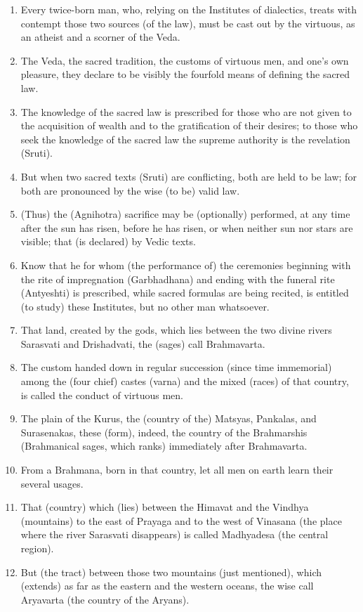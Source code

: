 \begin{enumerate}
\item Every twice-born man, who, relying on the Institutes of dialectics, treats with contempt those two sources (of the law), must be cast out by the virtuous, as an atheist and a scorner of the Veda.
\item The Veda, the sacred tradition, the customs of virtuous men, and one's own pleasure, they declare to be visibly the fourfold means of defining the sacred law.
\item The knowledge of the sacred law is prescribed for those who are not given to the acquisition of wealth and to the gratification of their desires; to those who seek the knowledge of the sacred law the supreme authority is the revelation (Sruti).
\item But when two sacred texts (Sruti) are conflicting, both are held to be law; for both are pronounced by the wise (to be) valid law.
\item (Thus) the (Agnihotra) sacrifice may be (optionally) performed, at any time after the sun has risen, before he has risen, or when neither sun nor stars are visible; that (is declared) by Vedic texts.
\item Know that he for whom (the performance of) the ceremonies beginning with the rite of impregnation (Garbhadhana) and ending with the funeral rite (Antyeshti) is prescribed, while sacred formulas are being recited, is entitled (to study) these Institutes, but no other man whatsoever.
\item That land, created by the gods, which lies between the two divine rivers Sarasvati and Drishadvati, the (sages) call Brahmavarta.
\item The custom handed down in regular succession (since time immemorial) among the (four chief) castes (varna) and the mixed (races) of that country, is called the conduct of virtuous men.
\item The plain of the Kurus, the (country of the) Matsyas, Pankalas, and Surasenakas, these (form), indeed, the country of the Brahmarshis (Brahmanical sages, which ranks) immediately after Brahmavarta.
\item From a Brahmana, born in that country, let all men on earth learn their several usages.
\item That (country) which (lies) between the Himavat and the Vindhya (mountains) to the east of Prayaga and to the west of Vinasana (the place where the river Sarasvati disappears) is called Madhyadesa (the central region).
\item But (the tract) between those two mountains (just mentioned), which (extends) as far as the eastern and the western oceans, the wise call Aryavarta (the country of the Aryans).

\end{enumerate}
